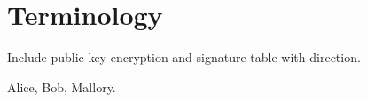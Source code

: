 
\section{Terminology}
Include public-key encryption and signature table with direction.

Alice, Bob, Mallory.
